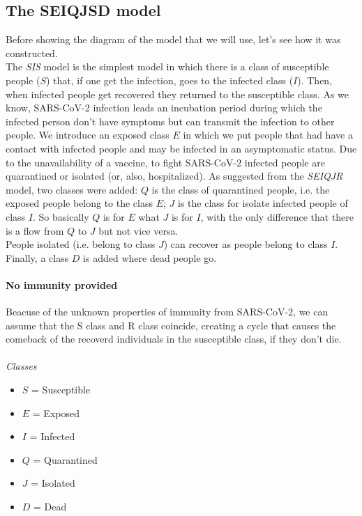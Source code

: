 \documentclass[12pt]{llncs}
\begin{document}
\subsection{The SEIQJSD model}
Before showing the diagram of the model that we will use, let's see how it was constructed.\\
The \textit{SIS} model is the simplest model in which there is a class of susceptible people ($S$) that, if one get the infection, goes to the infected class ($I$). Then, when infected people get recovered they returned to the susceptible class.
As we know, SARS-CoV-2 infection leads an incubation period during which the infected person don't have symptoms but can transmit the infection to other people. We introduce an exposed class $E$ in which we put people that had have a contact with infected people and may be infected in an asymptomatic status.
Due to the unavailability of a vaccine, to fight SARS-CoV-2 infected people are quarantined or isolated (or, also, hospitalized). As suggested from the \textit{SEIQJR} model, two classes were added: $Q$ is the class of quarantined people, i.e. the exposed people belong to the class $E$; $J$ is the class for isolate infected people of class $I$. So basically $Q$ is for $E$ what $J$ is for $I$, with the only difference that there is a flow from $Q$ to $J$ but not vice versa.\\
People isolated (i.e. belong to class $J$) can recover as people belong to class $I$. Finally, a class $D$ is added where dead people go.

\paragraph{\textbf{No immunity provided}}
Beacuse of the unknown properties of immunity from SARS-CoV-2, we can assume that the S class and R class coincide, creating a cycle that causes the comeback of the recoverd individuals in the susceptible class, if they don't die.
\\\\
\textit{Classes}
\begin{multicols}{3}
\begin{itemize}
\item $S$ = Susceptible
\item $E$ = Exposed
\item $I$ = Infected
\item $Q$ = Quarantined
\item $J$ = Isolated
\item $D$ = Dead
\end{itemize}
\end{multicols}
\end{document}
